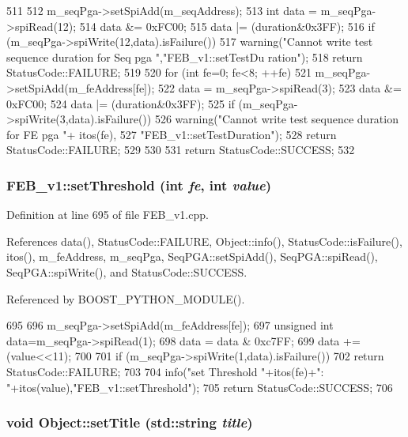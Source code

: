 \begin{DoxyCode}
511                                               {
512   m_seqPga->setSpiAdd(m_seqAddress);
513   int data = m_seqPga->spiRead(12);
514   data &= 0xFC00;
515   data |= (duration&0x3FF);
516   if (m_seqPga->spiWrite(12,data).isFailure()){
517     warning("Cannot write test sequence duration for Seq pga ","FEB_v1::setTestDu
      ration");
518     return StatusCode::FAILURE;
519   }
520   for (int fe=0; fe<8; ++fe){
521     m_seqPga->setSpiAdd(m_feAddress[fe]);
522     data = m_seqPga->spiRead(3);
523     data &= 0xFC00;
524     data |= (duration&0x3FF);
525     if (m_seqPga->spiWrite(3,data).isFailure()){
526       warning("Cannot write test sequence duration for FE pga "+ itos(fe),
527           "FEB_v1::setTestDuration");
528       return StatusCode::FAILURE;
529     }
530   }
531   return StatusCode::SUCCESS;
532 }
\end{DoxyCode}
\hypertarget{classFEB__v1_a02416559cdd68e8aa57f47ce7cf6788c}{
\subsubsection[{setThreshold}]{ FEB\_\-v1::setThreshold (int {\em fe}, \/  int {\em value})}}
\label{classFEB__v1_a02416559cdd68e8aa57f47ce7cf6788c}


Definition at line 695 of file FEB\_\-v1.cpp.

References data(), StatusCode::FAILURE, Object::info(), StatusCode::isFailure(), itos(), m\_\-feAddress, m\_\-seqPga, SeqPGA::setSpiAdd(), SeqPGA::spiRead(), SeqPGA::spiWrite(), and StatusCode::SUCCESS.

Referenced by BOOST\_\-PYTHON\_\-MODULE().


\begin{DoxyCode}
695                                                   {
696   m_seqPga->setSpiAdd(m_feAddress[fe]);
697   unsigned int data=m_seqPga->spiRead(1);
698   data = data & 0xc7FF;
699   data += (value<<11);
700   
701   if (m_seqPga->spiWrite(1,data).isFailure()){
702     return StatusCode::FAILURE;
703   }
704   info("set Threshold "+itos(fe)+": "+itos(value),"FEB_v1::setThreshold");
705   return StatusCode::SUCCESS;
706 }
\end{DoxyCode}
\hypertarget{classObject_a89557dbbad5bcaa02652f5d7fa35d20f}{
\subsubsection[{setTitle}]{\setlength{\rightskip}{0pt plus 5cm}void Object::setTitle (std::string {\em title})}}
\label{classObject_a89557dbbad5bcaa02652f5d7fa35d20f}


